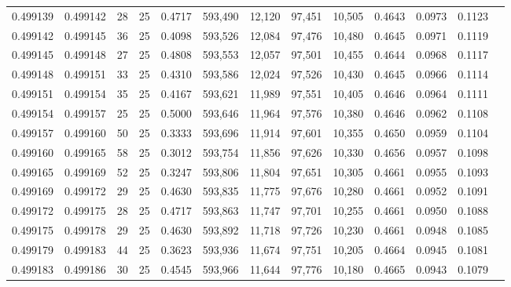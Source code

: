 \begin{tabular}{rrrrrrrrrrrrr}
0.499139 & 0.499142 &    28 &  25 &                                     0.4717 & 593,490 &  12,120 &  97,451 &  10,505 & 0.4643 & 0.0973 & 0.1123 \\
0.499142 & 0.499145 &    36 &  25 &                                     0.4098 & 593,526 &  12,084 &  97,476 &  10,480 & 0.4645 & 0.0971 & 0.1119 \\
0.499145 & 0.499148 &    27 &  25 &                                     0.4808 & 593,553 &  12,057 &  97,501 &  10,455 & 0.4644 & 0.0968 & 0.1117 \\
0.499148 & 0.499151 &    33 &  25 &                                     0.4310 & 593,586 &  12,024 &  97,526 &  10,430 & 0.4645 & 0.0966 & 0.1114 \\
0.499151 & 0.499154 &    35 &  25 &                                     0.4167 & 593,621 &  11,989 &  97,551 &  10,405 & 0.4646 & 0.0964 & 0.1111 \\
0.499154 & 0.499157 &    25 &  25 &                                     0.5000 & 593,646 &  11,964 &  97,576 &  10,380 & 0.4646 & 0.0962 & 0.1108 \\
0.499157 & 0.499160 &    50 &  25 &                                     0.3333 & 593,696 &  11,914 &  97,601 &  10,355 & 0.4650 & 0.0959 & 0.1104 \\
0.499160 & 0.499165 &    58 &  25 &                                     0.3012 & 593,754 &  11,856 &  97,626 &  10,330 & 0.4656 & 0.0957 & 0.1098 \\
0.499165 & 0.499169 &    52 &  25 &                                     0.3247 & 593,806 &  11,804 &  97,651 &  10,305 & 0.4661 & 0.0955 & 0.1093 \\
0.499169 & 0.499172 &    29 &  25 &                                     0.4630 & 593,835 &  11,775 &  97,676 &  10,280 & 0.4661 & 0.0952 & 0.1091 \\
0.499172 & 0.499175 &    28 &  25 &                                     0.4717 & 593,863 &  11,747 &  97,701 &  10,255 & 0.4661 & 0.0950 & 0.1088 \\
0.499175 & 0.499178 &    29 &  25 &                                     0.4630 & 593,892 &  11,718 &  97,726 &  10,230 & 0.4661 & 0.0948 & 0.1085 \\
0.499179 & 0.499183 &    44 &  25 &                                     0.3623 & 593,936 &  11,674 &  97,751 &  10,205 & 0.4664 & 0.0945 & 0.1081 \\
0.499183 & 0.499186 &    30 &  25 &                                     0.4545 & 593,966 &  11,644 &  97,776 &  10,180 & 0.4665 & 0.0943 & 0.1079 \\

\end{tabular}
